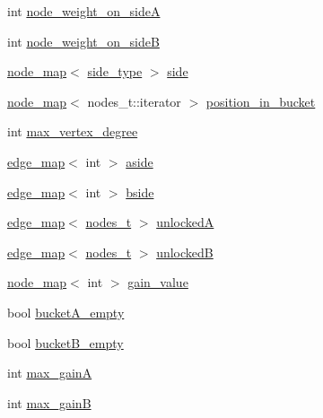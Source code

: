\begin{DoxyCompactItemize}
int \mbox{\hyperlink{classfm__partition_a8a50d15b399c9ed35d6987c8fb68aa2b}{node\+\_\+weight\+\_\+on\+\_\+sideA}}
\item 
int \mbox{\hyperlink{classfm__partition_a6dc967e385b31096a85f17c51f1f0824}{node\+\_\+weight\+\_\+on\+\_\+sideB}}
\item 
\mbox{\hyperlink{classnode__map}{node\+\_\+map}}$<$ \mbox{\hyperlink{classfm__partition_a7cdff1bea3740a287387e8408e16ca79}{side\+\_\+type}} $>$ \mbox{\hyperlink{classfm__partition_af83309e781e9658fc0ff923ced087bfc}{side}}
\item 
\mbox{\hyperlink{classnode__map}{node\+\_\+map}}$<$ nodes\+\_\+t\+::iterator $>$ \mbox{\hyperlink{classfm__partition_ad17406d94b53c327e31b28e462de010f}{position\+\_\+in\+\_\+bucket}}
\item 
int \mbox{\hyperlink{classfm__partition_ab6a4beaa10548ce9f1a0e8e441492ef9}{max\+\_\+vertex\+\_\+degree}}
\item 
\mbox{\hyperlink{classedge__map}{edge\+\_\+map}}$<$ int $>$ \mbox{\hyperlink{classfm__partition_a14b0aa9a91a6e7fa3035669cf5056275}{aside}}
\item 
\mbox{\hyperlink{classedge__map}{edge\+\_\+map}}$<$ int $>$ \mbox{\hyperlink{classfm__partition_aa75765887173fb06b076b6cae12d4e66}{bside}}
\item 
\mbox{\hyperlink{classedge__map}{edge\+\_\+map}}$<$ \mbox{\hyperlink{edge_8h_a22ac17689106ba21a84e7bc54d1199d6}{nodes\+\_\+t}} $>$ \mbox{\hyperlink{classfm__partition_a9d75a1d63f711a0c66ae7f5bc181cd8b}{unlockedA}}
\item 
\mbox{\hyperlink{classedge__map}{edge\+\_\+map}}$<$ \mbox{\hyperlink{edge_8h_a22ac17689106ba21a84e7bc54d1199d6}{nodes\+\_\+t}} $>$ \mbox{\hyperlink{classfm__partition_a74865bf3e6b6f73350c43c3ad9dfda96}{unlockedB}}
\item 
\mbox{\hyperlink{classnode__map}{node\+\_\+map}}$<$ int $>$ \mbox{\hyperlink{classfm__partition_ae8176f4ce82305abfd58e519d2cdd91d}{gain\+\_\+value}}
\item 
bool \mbox{\hyperlink{classfm__partition_a4df2f0f6f4686ba187c2be39ce3b29cc}{bucket\+A\+\_\+empty}}
\item 
bool \mbox{\hyperlink{classfm__partition_aef7d0f91cb7c04b4f5b1b14cc9884c37}{bucket\+B\+\_\+empty}}
\item 
int \mbox{\hyperlink{classfm__partition_a6c6a7a05bebe943e681329d30bb13339}{max\+\_\+gainA}}
\item 
int \mbox{\hyperlink{classfm__partition_ac230f89828768eaf51374c0bc3b37558}{max\+\_\+gainB}}
\item 

\end{DoxyCompactItemize}
